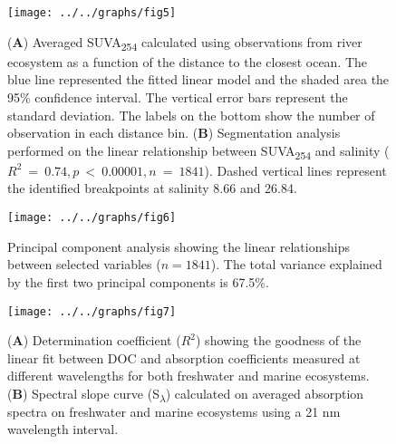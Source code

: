 \documentclass[10pt,a4paper]{scrartcl}
\begin{document}
\begin{figure}[h]
	\centering
	\texttt{[image: ../../graphs/fig5]}
	\caption{ (\textbf{A}) Averaged SUVA\textsubscript{254} calculated using observations from river ecosystem as a function of the distance to the closest ocean. The blue line represented the fitted linear model and the shaded area the 95\% confidence interval. The vertical error bars represent the standard deviation. The labels on the bottom show the number of observation in each distance bin. (\textbf{B}) Segmentation analysis performed on the linear relationship between SUVA\textsubscript{254} and salinity ($R^2~=~0.74, p~<~0.00001, n~=~1841$). Dashed vertical lines represent the identified breakpoints at salinity 8.66 and 26.84.}
\end{figure}

\clearpage
\newpage

\begin{figure}[h]
	\centering
	\texttt{[image: ../../graphs/fig6]}
	\caption{Principal component analysis showing the linear relationships between selected variables ($n = 1841$). The total variance explained by the first two principal components is 67.5\%.}
\end{figure}

\clearpage
\newpage

\begin{figure}[h]
	\centering
	\texttt{[image: ../../graphs/fig7]}
	\caption{(\textbf{A}) Determination coefficient ($R^2$) showing the goodness of the linear fit between DOC and absorption coefficients measured at different wavelengths for both freshwater and marine ecosystems. (\textbf{B}) Spectral slope curve (S\textsubscript{$\lambda$}) calculated on averaged absorption spectra on freshwater and marine ecosystems using a 21 nm wavelength interval.}
\end{figure}
\end{document}
